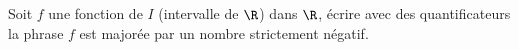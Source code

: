 Soit $f$ une fonction de $I$ (intervalle de $\R$) dans $\R$, \'{e}crire avec des quantificateurs la phrase $f$ est major\'ee par un nombre strictement n\'egatif.\bigskip \bigskip